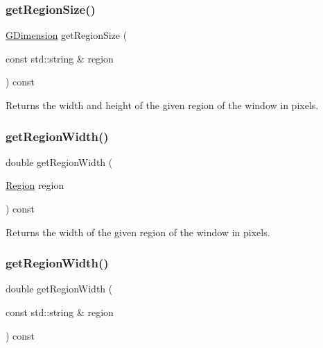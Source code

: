 \subsubsection{\texorpdfstring{get\+Region\+Size()}{getRegionSize()}\hspace{0.1cm}{\footnotesize\ttfamily [2/2]}}
{\footnotesize\ttfamily \mbox{\hyperlink{structGDimension}{G\+Dimension}} get\+Region\+Size (\begin{DoxyParamCaption}\item[{const std\+::string \&}]{region }\end{DoxyParamCaption}) const\hspace{0.3cm}{\ttfamily [virtual]}}



Returns the width and height of the given region of the window in pixels. 

\mbox{\label{classGWindow_a96e2005c3f447a8679c3c32d3fc02de1}} 
\subsubsection{\texorpdfstring{get\+Region\+Width()}{getRegionWidth()}\hspace{0.1cm}{\footnotesize\ttfamily [1/2]}}
{\footnotesize\ttfamily double get\+Region\+Width (\begin{DoxyParamCaption}\item[{\mbox{\hyperlink{classGWindow_a81a01a86de31071a92e6cce0bab9bc4b}{Region}}}]{region }\end{DoxyParamCaption}) const\hspace{0.3cm}{\ttfamily [virtual]}}



Returns the width of the given region of the window in pixels. 

\mbox{\label{classGWindow_ab169dab454fc90f1c845b91b4e1a8a14}} 
\subsubsection{\texorpdfstring{get\+Region\+Width()}{getRegionWidth()}\hspace{0.1cm}{\footnotesize\ttfamily [2/2]}}
{\footnotesize\ttfamily double get\+Region\+Width (\begin{DoxyParamCaption}\item[{const std\+::string \&}]{region }\end{DoxyParamCaption}) const\hspace{0.3cm}{\ttfamily [virtual]}}



